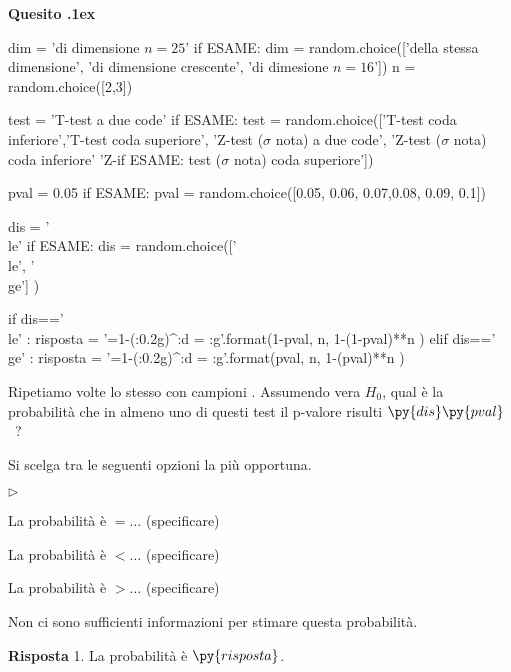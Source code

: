 \documentclass[11pt,twoside,a4paper]{article}
\newcommand{\mylabel}[1]{#1\hfill}
\renewenvironment{itemize}
  {\begin{list}{$\triangleright$}{%
   \setlength{\parskip}{0mm}
   \setlength{\topsep}{.4\baselineskip}
   \setlength{\rightmargin}{0mm}
   \setlength{\listparindent}{0mm}
   \setlength{\itemindent}{0mm}
   \setlength{\labelwidth}{2ex}
   \setlength{\itemsep}{.4\baselineskip}
   \setlength{\parsep}{0mm}
   \setlength{\partopsep}{0mm}
   \setlength{\labelsep}{1ex}
   \setlength{\leftmargin}{\labelwidth+\labelsep}
   \let\makelabel\mylabel}}{%
   \end{list}\vspace*{-1.3mm}}
\newcounter{quesito}
\newenvironment{xquestion}{\bigskip\addtocounter{quesito}{1}\par\textbf{Quesito \thequesito.\kern1ex}}{\vspace{\parskip}}
\newenvironment{answer}{\par\textbf{Risposta\quad}}{\vspace{\parskip}}
\begin{document}
\begin{xquestion} %
\begin{pycode}
dim = 'di dimensione $n = 25$'
if ESAME: dim  = random.choice(['della stessa dimensione', 'di dimensione crescente', 'di dimesione $n =16$'])
n = random.choice([2,3])

test = 'T-test a due code'
if ESAME: test = random.choice(['T-test coda inferiore','T-test coda superiore', 'Z-test ($\sigma$ nota) a due code', 'Z-test ($\sigma$ nota) coda inferiore' 'Z-if ESAME: test ($\sigma$ nota) coda superiore'])


pval = 0.05
if ESAME: pval = random.choice([0.05, 0.06, 0.07,0.08, 0.09, 0.1])

dis = '\\le'
if ESAME: dis = random.choice(['\\le', '\\ge'] )

if   dis=='\\le' : risposta = '=1-({:0.2g})^{:d} = {:g}'.format(1-pval, n, 1-(1-pval)**n )
elif dis=='\\ge' : risposta = '=1-({:0.2g})^{:d} = {:g}'.format(pval, n, 1-(pval)**n )
\end{pycode}
Ripetiamo  volte lo stesso  con campioni .
Assumendo vera $H_0$, qual è la probabilità che in almeno uno di questi test il p-valore risulti $\py{dis}\py{pval}$~? 

Si scelga tra le seguenti opzioni la più opportuna.
\begin{itemize}
\item[1.] La probabilità è $=\dots$ (specificare)
\item[2.] La probabilità è $<\dots$ (specificare)
\item[3.] La probabilità è $>\dots$ (specificare)
\item[4.] Non ci sono sufficienti informazioni per stimare questa probabilità.
\end{itemize}
\begin{answer}
{\color{blue}1. La probabilità è $\py{risposta}$.}
\end{answer}
\end{xquestion}
\end{document}
